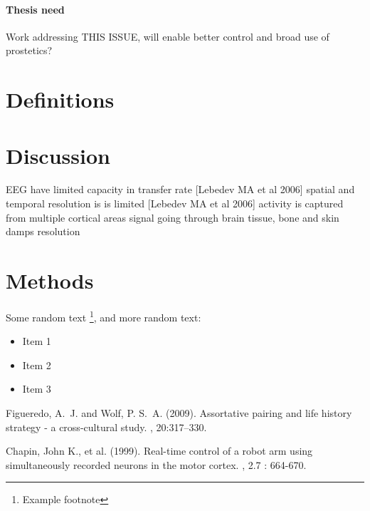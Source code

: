 \documentclass[twoside]{article}
\begin{document}
\paragraph{Thesis need}
Work addressing THIS ISSUE, will enable better control and broad use of prostetics?


\blindtext

\blindtext

\section{Definitions}

\blindtext

\blindtext
\section{Discussion}
EEG
  have limited capacity in transfer rate [Lebedev MA et al 2006]
  spatial and temporal resolution is is limited [Lebedev MA et al 2006]
    activity is captured from multiple cortical areas
    signal going through brain tissue, bone and skin damps resolution



\section{Methods}

Some random text \footnote{Example footnote}, and more random text:

\begin{itemize}
\item Item 1 \cite{Figueredo:2009dg}
\item Item 2
\item Item 3
\end{itemize}




\begin{thebibliography}{99} %

Figueredo, A.~J. and Wolf, P. S.~A. (2009).
\newblock Assortative pairing and life history strategy - a cross-cultural
  study.
, 20:317--330.

Chapin, John K., et al. (1999).
\newblock Real-time control of a robot arm using simultaneously recorded neurons in the motor cortex.
, 2.7 : 664-670.

\end{thebibliography}

\end{document}
